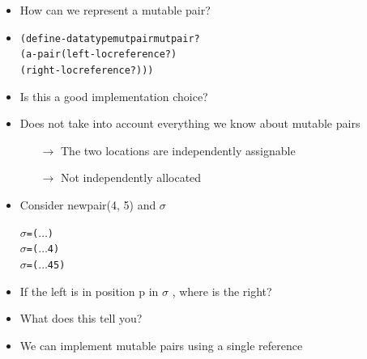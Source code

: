 \documentclass{beamer}
\newcommand{\arrow}{\(\rightarrow\)}
\newcommand{\dotss}{\(\ldots\)}
\begin{document}
\begin{frame}[fragile]
\begin{scriptsize}
\begin{itemize}
\item<1-> How can we represent a mutable pair?

\item<2->
\begin{alltt}
(define-datatype mutpair mutpair?
  (a-pair (left-loc reference?)
          (right-loc reference?)))
\end{alltt}

\item<2-> Is this a good implementation choice?

\item<3-> Does not take into account everything we know about mutable pairs
\begin{itemize}
\item[\arrow] The two locations are independently assignable
\item[\arrow] Not independently allocated
\end{itemize}

\item<4-> Consider newpair(4, 5) and $\sigma$
\begin{alltt}
     \(\sigma\) = ( \dotss )
     \(\sigma\) = ( \dotss 4)	
     \(\sigma\) = ( \dotss 4 5)
\end{alltt}

\item<5-> If the left is in position p in $\sigma$ , where is the right?

\item<6-> What does this tell you?

\item<7-> We can implement mutable pairs using a single reference

\end{itemize}
\end{scriptsize}
\end{frame}
\end{document}
